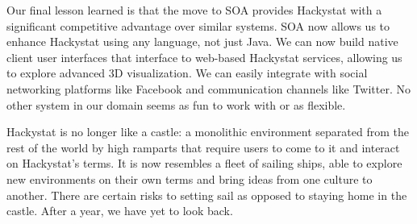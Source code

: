 \documentclass[conference,compsoc]{IEEEtran}
\begin{document}
Our final lesson learned is that the move to SOA provides Hackystat with a
significant competitive advantage over similar systems.  SOA now allows us
to enhance Hackystat using any language, not just Java.  We can now build
native client user interfaces that interface to web-based Hackystat
services, allowing us to explore advanced 3D visualization.  We can easily
integrate with social networking platforms like Facebook and communication
channels like Twitter.  No other system in our domain seems as fun
to work with or as flexible. 

Hackystat is no longer like a castle: a monolithic environment separated
from the rest of the world by high ramparts that require users to come to it
and interact on Hackystat's terms. It is now resembles a fleet of sailing
ships, able to explore new environments on their own terms and bring ideas
from one culture to another.  There are certain risks to setting sail as
opposed to staying home in the castle.  After a year, we have yet to look
back. 



\end{document}
